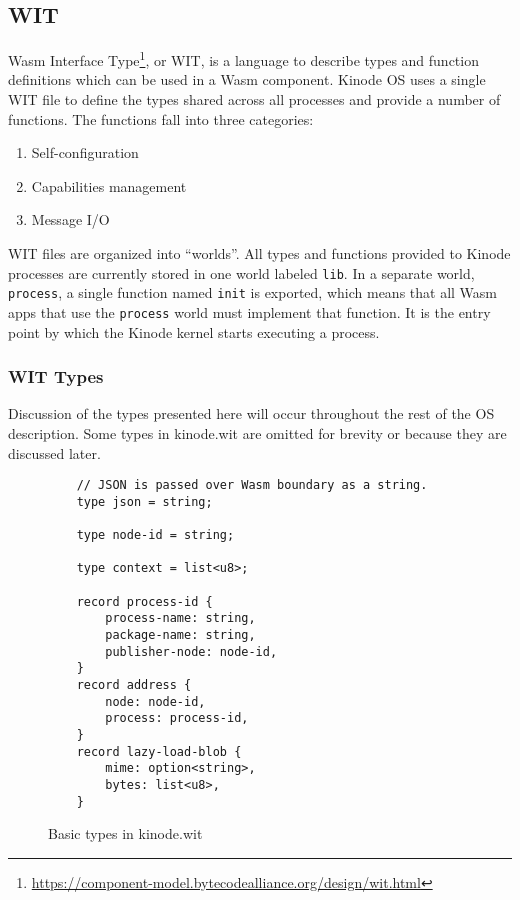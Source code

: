 \documentclass[runningheads]{llncs}
\begin{document}
\subsection{WIT}
\label{sec:oswit}

Wasm Interface Type\footnote{\url{https://component-model.bytecodealliance.org/design/wit.html}}, or WIT, is a language to describe types and function definitions which can be used in a Wasm component.
Kinode OS uses a single WIT file to define the types shared across all processes and provide a number of functions.
The functions fall into three categories:
\begin{enumerate}
    \item Self-configuration
    \item Capabilities management
    \item Message I/O
\end{enumerate}

WIT files are organized into ``worlds''. All types and functions provided to Kinode processes are currently stored in one world labeled \verb|lib|.
In a separate world, \verb|process|, a single function named \verb|init| is exported, which means that all Wasm apps that use the \verb|process| world must implement that function.
It is the entry point by which the Kinode kernel starts executing a process.

\subsubsection{WIT Types}
\label{sec:oswittypes}

Discussion of the types presented here will occur throughout the rest of the OS description.
Some types in kinode.wit are omitted for brevity or because they are discussed later.

\begin{figure}[H]
    \centering
    \begin{verbatim}
    // JSON is passed over Wasm boundary as a string.
    type json = string;

    type node-id = string;

    type context = list<u8>;

    record process-id {
        process-name: string,
        package-name: string,
        publisher-node: node-id,
    }
    record address {
        node: node-id,
        process: process-id,
    }
    record lazy-load-blob {
        mime: option<string>,
        bytes: list<u8>,
    }
    \end{verbatim}
    \caption{Basic types in kinode.wit}
    \label{fig:WIT Types 1}
\end{figure}
\end{document}

